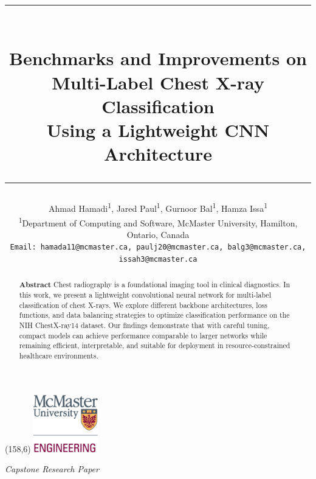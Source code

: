 \documentclass[12pt]{article}
\title{
\vspace{-2em}
\rule{\textwidth}{0.4pt} \\[0.5em]
\textbf{\LARGE Benchmarks and Improvements on\\ Multi-Label Chest X-ray Classification\\ Using a Lightweight CNN Architecture} \\
\rule{\textwidth}{0.4pt}
}
\author{
Ahmad Hamadi\textsuperscript{1}, Jared Paul\textsuperscript{1}, Gurnoor Bal\textsuperscript{1}, Hamza Issa\textsuperscript{1} \\
\textsuperscript{1}Department of Computing and Software, McMaster University, Hamilton, Ontario, Canada \\
\texttt{Email: hamada11@mcmaster.ca, paulj20@mcmaster.ca, balg3@mcmaster.ca, issah3@mcmaster.ca}
}
\date{}
\begin{document}
\begin{textblock}{40}(158,6)
    \includegraphics[width=2.8cm]{McMaster_Faculty_of_Engineering_logo.png}
\end{textblock}

\maketitle

\vspace{-1em}
\noindent\textit{Capstone Research Paper}

\vspace{1em}

\begin{abstract}
\noindent
\textbf{Abstract} Chest radiography is a foundational imaging tool in clinical diagnostics. In this work, we present a lightweight convolutional neural network for multi-label classification of chest X-rays. We explore different backbone architectures, loss functions, and data balancing strategies to optimize classification performance on the NIH ChestX-ray14 dataset. Our findings demonstrate that with careful tuning, compact models can achieve performance comparable to larger networks while remaining efficient, interpretable, and suitable for deployment in resource-constrained healthcare environments.
\end{abstract}

\vspace{1em}
\end{document}
